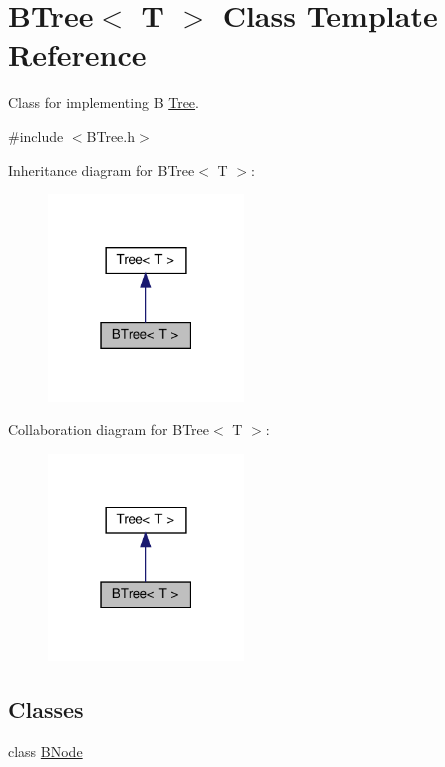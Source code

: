 \hypertarget{classBTree}{}\section{B\+Tree$<$ T $>$ Class Template Reference}
\label{classBTree}


Class for implementing B \hyperlink{classTree}{Tree}.  




{\ttfamily \#include $<$B\+Tree.\+h$>$}



Inheritance diagram for B\+Tree$<$ T $>$\+:
\nopagebreak
\begin{figure}[H]
\begin{center}
\leavevmode
\includegraphics[width=147pt]{classBTree__inherit__graph}
\end{center}
\end{figure}


Collaboration diagram for B\+Tree$<$ T $>$\+:
\nopagebreak
\begin{figure}[H]
\begin{center}
\leavevmode
\includegraphics[width=147pt]{classBTree__coll__graph}
\end{center}
\end{figure}
\subsection*{Classes}
\begin{DoxyCompactItemize}
\item 
class \hyperlink{classBTree_1_1BNode}{B\+Node}
\end{DoxyCompactItemize}
